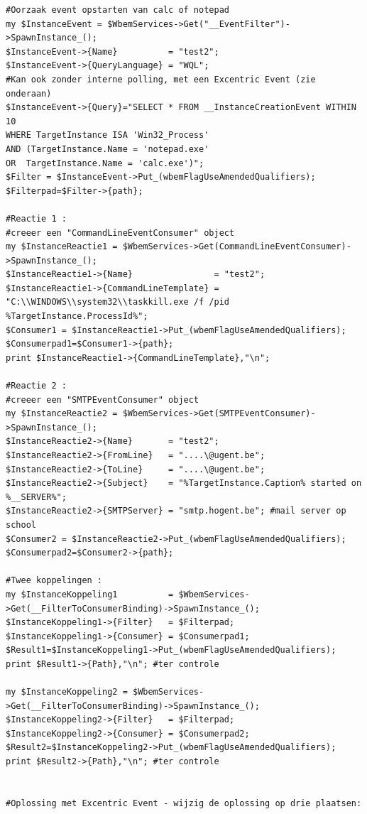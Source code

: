 \documentclass[11pt,a4paper]{report}
\begin{document}
\begin{enumerate}[resume]
\begin{lstlisting}
#Oorzaak event opstarten van calc of notepad
my $InstanceEvent = $WbemServices->Get("__EventFilter")->SpawnInstance_();
$InstanceEvent->{Name}          = "test2";
$InstanceEvent->{QueryLanguage} = "WQL";
#Kan ook zonder interne polling, met een Excentric Event (zie onderaan)
$InstanceEvent->{Query}="SELECT * FROM __InstanceCreationEvent WITHIN 10 
WHERE TargetInstance ISA 'Win32_Process' 
AND (TargetInstance.Name = 'notepad.exe'
OR  TargetInstance.Name = 'calc.exe')";
$Filter = $InstanceEvent->Put_(wbemFlagUseAmendedQualifiers);
$Filterpad=$Filter->{path};

#Reactie 1 :
#creeer een "CommandLineEventConsumer" object
my $InstanceReactie1 = $WbemServices->Get(CommandLineEventConsumer)->SpawnInstance_();
$InstanceReactie1->{Name}                = "test2";
$InstanceReactie1->{CommandLineTemplate} = "C:\\WINDOWS\\system32\\taskkill.exe /f /pid %TargetInstance.ProcessId%";
$Consumer1 = $InstanceReactie1->Put_(wbemFlagUseAmendedQualifiers);
$Consumerpad1=$Consumer1->{path}; 
print $InstanceReactie1->{CommandLineTemplate},"\n";

#Reactie 2 :
#creeer een "SMTPEventConsumer" object
my $InstanceReactie2 = $WbemServices->Get(SMTPEventConsumer)->SpawnInstance_();
$InstanceReactie2->{Name}       = "test2";
$InstanceReactie2->{FromLine}   = "....\@ugent.be";
$InstanceReactie2->{ToLine}     = "....\@ugent.be";
$InstanceReactie2->{Subject}    = "%TargetInstance.Caption% started on %__SERVER%";
$InstanceReactie2->{SMTPServer} = "smtp.hogent.be"; #mail server op school
$Consumer2 = $InstanceReactie2->Put_(wbemFlagUseAmendedQualifiers);
$Consumerpad2=$Consumer2->{path}; 

#Twee koppelingen :
my $InstanceKoppeling1          = $WbemServices->Get(__FilterToConsumerBinding)->SpawnInstance_();
$InstanceKoppeling1->{Filter}   = $Filterpad;
$InstanceKoppeling1->{Consumer} = $Consumerpad1;
$Result1=$InstanceKoppeling1->Put_(wbemFlagUseAmendedQualifiers);
print $Result1->{Path},"\n"; #ter controle

my $InstanceKoppeling2 = $WbemServices->Get(__FilterToConsumerBinding)->SpawnInstance_();
$InstanceKoppeling2->{Filter}   = $Filterpad;
$InstanceKoppeling2->{Consumer} = $Consumerpad2;
$Result2=$InstanceKoppeling2->Put_(wbemFlagUseAmendedQualifiers);
print $Result2->{Path},"\n"; #ter controle


#Oplossing met Excentric Event - wijzig de oplossing op drie plaatsen:


\end{lstlisting}
\end{enumerate}
\end{document}
